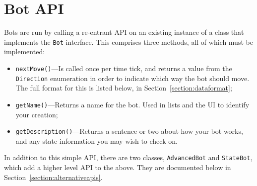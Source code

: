 \documentclass[11pt]{article}
\begin{document}
\section{Bot API}
Bots are run by calling a re-entrant API on an existing instance of a class that implements the \texttt{Bot} interface.  This comprises three methods, all of which must be implemented:
\begin{itemize}
\item \texttt{nextMove()}---Is called once per time tick, and returns a value from the \texttt{Direction} enumeration in order to indicate which way the bot should move.  The full format for this is listed below, in Section~\ref{section:dataformat};
\item \texttt{getName()}---Returns a name for the bot.  Used in lists and the UI to identify your creation;
\item \texttt{getDescription()}---Returns a sentence or two about how your bot works, and any state information you may wish to check on.
\end{itemize}
In addition to this simple API, there are two classes, \texttt{AdvancedBot} and \texttt{StateBot}, which add a higher level API to the above.  They are documented below in Section~\ref{section:alternativeapis}.
\end{document}
